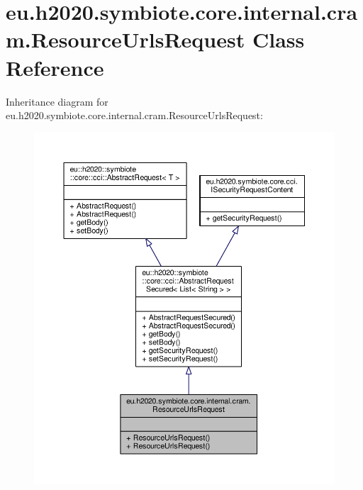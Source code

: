 \hypertarget{classeu_1_1h2020_1_1symbiote_1_1core_1_1internal_1_1cram_1_1ResourceUrlsRequest}{}\section{eu.\+h2020.\+symbiote.\+core.\+internal.\+cram.\+Resource\+Urls\+Request Class Reference}
\label{classeu_1_1h2020_1_1symbiote_1_1core_1_1internal_1_1cram_1_1ResourceUrlsRequest}


Inheritance diagram for eu.\+h2020.\+symbiote.\+core.\+internal.\+cram.\+Resource\+Urls\+Request\+:\nopagebreak
\begin{figure}[H]
\begin{center}
\leavevmode
\includegraphics[width=350pt]{classeu_1_1h2020_1_1symbiote_1_1core_1_1internal_1_1cram_1_1ResourceUrlsRequest__inherit__graph}
\end{center}
\end{figure}


